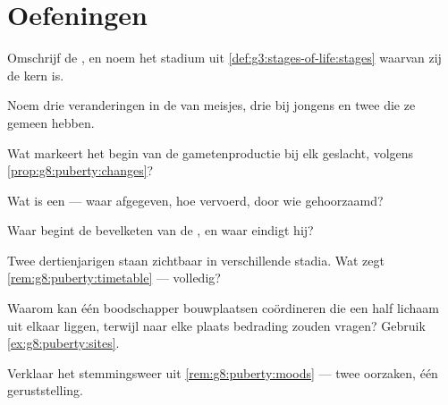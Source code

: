 \section{Oefeningen}

\begin{exercise}[$\star$]\label{exo:g8:puberty:1}
Omschrijf de , en noem het stadium uit
\cref{def:g3:stages-of-life:stages} waarvan zij de kern is.
\end{exercise}

\begin{exercise}[$\star$]\label{exo:g8:puberty:2}
Noem drie veranderingen in de  van meisjes, drie bij jongens en
twee die ze gemeen hebben.
\end{exercise}

\begin{exercise}[$\star$]\label{exo:g8:puberty:3}
Wat markeert het begin van de gametenproductie bij elk geslacht, volgens
\cref{prop:g8:puberty:changes}?
\end{exercise}

\begin{exercise}[$\star$]\label{exo:g8:puberty:4}
Wat is een  --- waar afgegeven, hoe vervoerd, door wie gehoorzaamd?
\end{exercise}

\begin{exercise}[$\star$]\label{exo:g8:puberty:5}
Waar begint de bevelketen van de , en waar eindigt hij?
\end{exercise}

\begin{exercise}[$\star$]\label{exo:g8:puberty:6}
Twee dertienjarigen staan zichtbaar in verschillende stadia. Wat zegt
\cref{rem:g8:puberty:timetable} --- volledig?
\end{exercise}

\begin{exercise}[$\star\star$]\label{exo:g8:puberty:7}
Waarom kan één boodschapper bouwplaatsen coördineren die een half lichaam
uit elkaar liggen, terwijl  naar elke plaats bedrading zouden
vragen? Gebruik \cref{ex:g8:puberty:sites}.
\end{exercise}

\begin{exercise}[$\star\star$]\label{exo:g8:puberty:8}
Verklaar het stemmingsweer uit \cref{rem:g8:puberty:moods} --- twee
oorzaken, één geruststelling.
\end{exercise}

